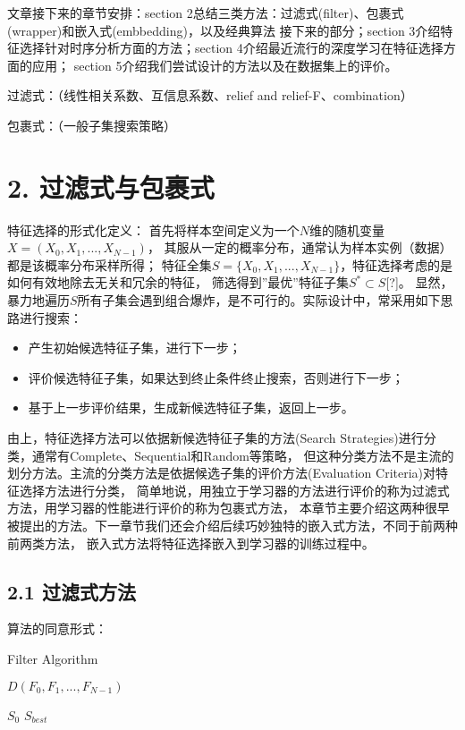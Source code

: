 \documentclass[a4paper,UTF8]{article}
\begin{document}
  文章接下来的章节安排：section 2总结三类方法：过滤式(filter)、包裹式(wrapper)和嵌入式(embbedding)，以及经典算法
  接下来的部分；section 3介绍特征选择针对时序分析方面的方法；section 4介绍最近流行的深度学习在特征选择方面的应用；
  section 5介绍我们尝试设计的方法以及在数据集上的评价。

  过滤式：（线性相关系数、互信息系数、relief and relief-F、combination）

  包裹式：（一般子集搜索策略）





\section*{2. 过滤式与包裹式}
  特征选择的形式化定义：
  首先将样本空间定义为一个$ N $维的随机变量$ X = (X_{0}, X_{1}, ... , X_{N-1})$，
  其服从一定的概率分布，通常认为样本实例（数据）都是该概率分布采样所得；
  特征全集$ S = \{X_{0}, X_{1}, ... , X_{N-1}\} $，特征选择考虑的是如何有效地除去无关和冗余的特征，
  筛选得到”最优”特征子集$ S^{*} \subset S $[?]。
  显然，暴力地遍历$ S $所有子集会遇到组合爆炸，是不可行的。实际设计中，常采用如下思路进行搜索：

  \begin{itemize}

    \item 产生初始候选特征子集，进行下一步；
    \item 评价候选特征子集，如果达到终止条件终止搜索，否则进行下一步；
    \item 基于上一步评价结果，生成新候选特征子集，返回上一步。

  \end{itemize}
  由上，特征选择方法可以依据新候选特征子集的方法(Search Strategies)进行分类，通常有Complete、Sequential和Random等策略，
  但这种分类方法不是主流的划分方法。主流的分类方法是依据候选子集的评价方法(Evaluation Criteria)对特征选择方法进行分类，
  简单地说，用独立于学习器的方法进行评价的称为过滤式方法，用学习器的性能进行评价的称为包裹式方法，
  本章节主要介绍这两种很早被提出的方法。下一章节我们还会介绍后续巧妙独特的嵌入式方法，不同于前两种前两类方法，
  嵌入式方法将特征选择嵌入到学习器的训练过程中。


\subsection*{2.1 过滤式方法}
  算法的同意形式：

  \begin{algorithm}
    \caption{Filter Algorithm}
    \begin{algorithmic}
      \REQUIRE $ D(F_{0}, F_{1},..., F_{N-1})$

               $ S_{0}$
      \ENSURE $ S_{best} $

    \end{algorithmic}




  \end{algorithm}
\end{document}
